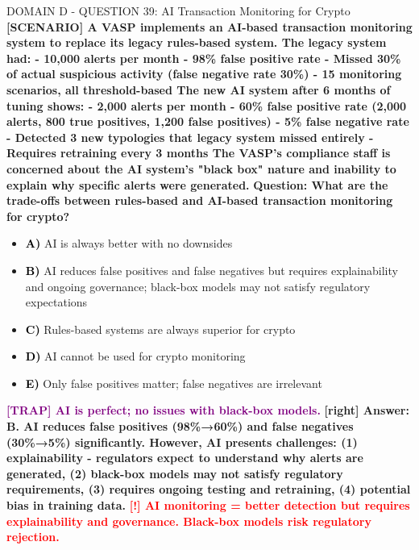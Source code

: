 \documentclass[11pt,a4paper]{beamer}
\newcommand{\redflag}[1]{\textcolor{red}{\textbf{[!] #1}}}
\newcommand{\trap}[1]{\textcolor{purple}{\textbf{[TRAP] #1}}}
\newcommand{\correct}[1]{\textcolor{green!50!black}{\textbf{[right] #1}}}
\newcommand{\scenario}[1]{\textcolor{blue!70!black}{\textbf{[SCENARIO] #1}}}
\newcommand{\option}[1]{\textcolor{black}{\textbf{#1}}}
\begin{document}
\begin{frame}{DOMAIN D - QUESTION 39: AI Transaction Monitoring for Crypto}
\scenario{A VASP implements an AI-based transaction monitoring system to replace its legacy rules-based system. The legacy system had:
- 10,000 alerts per month
- 98\% false positive rate
- Missed 30\% of actual suspicious activity (false negative rate 30\%)
- 15 monitoring scenarios, all threshold-based
The new AI system after 6 months of tuning shows:
- 2,000 alerts per month
- 60\% false positive rate (2,000 alerts, 800 true positives, 1,200 false positives)
- 5\% false negative rate
- Detected 3 new typologies that legacy system missed entirely
- Requires retraining every 3 months
The VASP's compliance staff is concerned about the AI system's "black box" nature and inability to explain why specific alerts were generated.}
\vspace{0.2cm}
\textbf{Question: What are the trade-offs between rules-based and AI-based transaction monitoring for crypto?}
\vspace{0.1cm}
\begin{itemize}
    \item \option{A)} AI is always better with no downsides
    \item \option{B)} AI reduces false positives and false negatives but requires explainability and ongoing governance; black-box models may not satisfy regulatory expectations
    \item \option{C)} Rules-based systems are always superior for crypto
    \item \option{D)} AI cannot be used for crypto monitoring
    \item \option{E)} Only false positives matter; false negatives are irrelevant
\end{itemize}
\vspace{0.2cm}
\trap{AI is perfect; no issues with black-box models.}
\correct{Answer: B. AI reduces false positives (98\%→60\%) and false negatives (30\%→5\%) significantly. However, AI presents challenges: (1) explainability - regulators expect to understand why alerts are generated, (2) black-box models may not satisfy regulatory requirements, (3) requires ongoing testing and retraining, (4) potential bias in training data.}
\redflag{AI monitoring = better detection but requires explainability and governance. Black-box models risk regulatory rejection.}
\end{frame}
\end{document}
